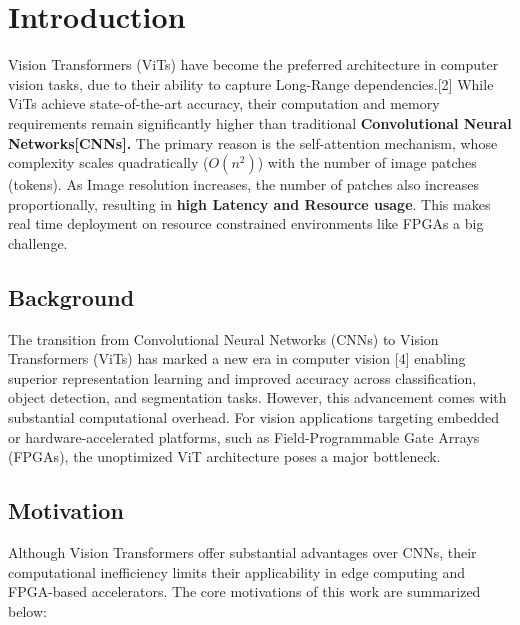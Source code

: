 \chapter{Introduction}

Vision Transformers (ViTs) have become the preferred architecture in computer vision tasks, due to their ability to capture Long-Range dependencies.[2] While ViTs achieve state-of-the-art accuracy, their computation and memory requirements remain significantly higher than traditional \textbf{Convolutional Neural Networks[CNNs].} The primary reason is the self-attention mechanism, whose complexity scales quadratically ($O(n^2)$) with the number of image patches (tokens). As Image resolution increases, the number of patches also increases proportionally, resulting in \textbf{high Latency and Resource usage}. This makes real time deployment on resource constrained environments like FPGAs a big challenge.

\section{Background}

The transition from Convolutional Neural Networks (CNNs) to Vision Transformers (ViTs) has marked a new era in computer vision [4] enabling superior representation learning and improved accuracy across classification, object detection, and segmentation tasks. However, this advancement comes with substantial computational overhead. For vision applications targeting embedded or hardware-accelerated platforms, such as Field-Programmable Gate Arrays (FPGAs), the unoptimized ViT architecture poses a major bottleneck.


\section{Motivation}

Although Vision Transformers offer substantial advantages over CNNs, their computational inefficiency limits their applicability in edge computing and FPGA-based accelerators. The core motivations of this work are summarized below:

